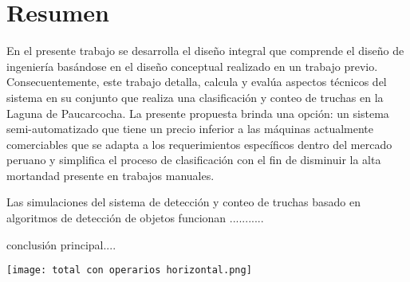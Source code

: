 
\newpage
\clearpage{\pagestyle{empty}\cleardoublepage}
\newpage

\pagestyle{empty}
\newpage
\chapter*{\centering \large Resumen} 


En el presente trabajo se desarrolla el diseño integral que comprende el diseño de ingeniería basándose en el diseño conceptual realizado en un trabajo previo. Consecuentemente, este trabajo detalla, calcula y evalúa aspectos técnicos del sistema en su conjunto que realiza una clasificación y conteo de truchas en la Laguna de Paucarcocha. La presente propuesta brinda una opción: un sistema semi-automatizado que tiene un precio inferior a las máquinas actualmente comerciables que se adapta a los requerimientos específicos dentro del mercado peruano y simplifica el proceso de clasificación con el fin de disminuir la alta mortandad presente en trabajos manuales. 

Las simulaciones del sistema de detección y conteo de truchas basado en algoritmos de detección de objetos funcionan ...........

conclusión principal....



\newpage

\begin{myfigure}[H]
	\footnotesize\centering
	\texttt{[image: total con operarios horizontal.png]}
\end{myfigure}
